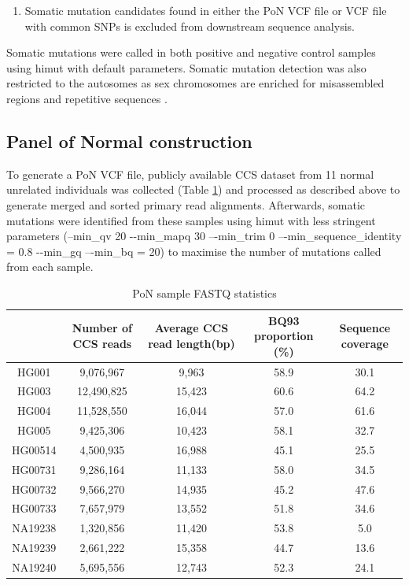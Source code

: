 \begin{enumerate}
\item Somatic mutation candidates found in either the PoN VCF file or VCF file with common SNPs is excluded from downstream sequence analysis. 
\end{enumerate}

Somatic mutations were called in both positive and negative control samples using himut with default parameters. Somatic mutation detection was also restricted to the autosomes as sex chromosomes are enriched for misassembled regions and repetitive sequences \cite{Skaletsky2003-sr}.


\subsection{Panel of Normal construction}

To generate a PoN VCF file, publicly available CCS dataset from 11 normal unrelated individuals was collected \cite{Zook2019-pm} (Table \ref{tab:pon-fastq-statistics}) and processed as described above to generate merged and sorted primary read alignments. Afterwards, somatic mutations were identified from these samples using himut with less stringent parameters (--min\_qv 20 -{}-min\_mapq 30 –{}-min\_trim 0 –{}-min\_sequence\_identity = 0.8 -{}-min\_gq –{}-min\_bq = 20) to maximise the number of mutations called from each sample. 

\begin{table}[h!]
\caption{PoN sample FASTQ statistics}
\label{tab:pon-fastq-statistics}
\begin{adjustbox}{max width=1.1\textwidth,center}
\begin{tabular}{c|c|c|c|c}
& Number of CCS reads & Average CCS read length(bp) & BQ93 proportion (\%) & Sequence coverage \\ \hline
HG001 & 9,076,967 & 9,963 & 58.9 & 30.1 \\ \hline
HG003 & 12,490,825 & 15,423 & 60.6 & 64.2 \\ \hline
HG004 & 11,528,550 & 16,044 & 57.0 & 61.6 \\ \hline
HG005 & 9,425,306 & 10,423 & 58.1 & 32.7  \\ \hline
HG00514 & 4,500,935 & 16,988 & 45.1 & 25.5 \\ \hline
HG00731 & 9,286,164 & 11,133 & 58.0 & 34.5 \\ \hline
HG00732 & 9,566,270 & 14,935 & 45.2 & 47.6 \\ \hline
HG00733 & 7,657,979 & 13,552 & 51.8 & 34.6 \\ \hline
NA19238 & 1,320,856 & 11,420 & 53.8 & 5.0 \\ \hline
NA19239 & 2,661,222 & 15,358 & 44.7 & 13.6 \\ \hline
NA19240 & 5,695,556 & 12,743 & 52.3 & 24.1 \\ \hline
\end{tabular}
\end{adjustbox}
\end{table}

